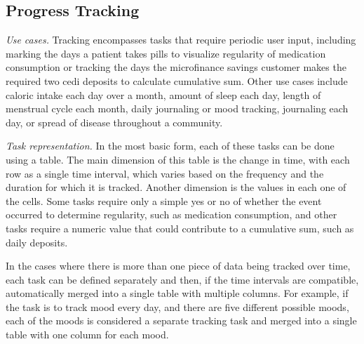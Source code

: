 \documentclass{sig-alternate}
\begin{document}

\subsection{Progress Tracking}
\label{sec:tracking}

\emph{Use cases.}
Tracking encompasses tasks that require periodic user input, including marking the days a patient takes pills to visualize regularity of medication consumption or tracking the days the microfinance savings customer makes the required two cedi deposits to calculate cumulative sum. Other use cases include caloric intake each day over a month, amount of sleep each day, length of menstrual cycle each month, daily journaling or mood tracking, journaling each day, or spread of disease throughout a community.

\emph{Task representation.}
In the most basic form, each of these tasks can be done using a table. The main dimension of this table is the change in time, with each row as a single time interval, which varies based on the frequency and the duration for which it is tracked. Another dimension is the values in each one of the cells. Some tasks require only a simple yes or no of whether the event occurred to determine regularity, such as medication consumption, and other tasks require a numeric value that could contribute to a cumulative sum, such as daily deposits.

In the cases where there is more than one piece of data being tracked over time, each task can be defined separately and then, if the time intervals are compatible, automatically merged into a single table with multiple columns. For example, if the task is to track mood every day, and there are five different possible moods, each of the moods is considered a separate tracking task and merged into a single table with one column for each mood. 
\end{document}
